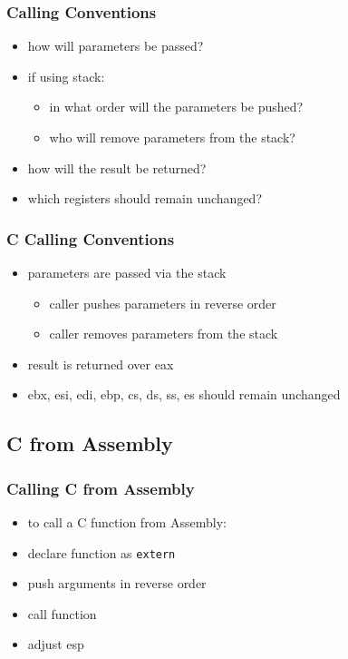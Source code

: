 \documentclass[dvipsnames]{beamer}
\begin{document}
\begin{frame}
  \frametitle{Calling Conventions}

  \begin{itemize}
    \item how will parameters be passed?
      \item if using stack:
      \begin{itemize}
        \item in what order will the parameters be pushed?
        \item who will remove parameters from the stack?
      \end{itemize}

    \item how will the result be returned?

    \item which registers should remain unchanged?
  \end{itemize}
\end{frame}

\begin{frame}
  \frametitle{C Calling Conventions}

  \begin{itemize}
    \item parameters are passed via the stack
    \begin{itemize}
      \item caller pushes parameters in reverse order
      \item caller removes parameters from the stack
    \end{itemize}

    \item result is returned over eax

    \item ebx, esi, edi, ebp, cs, ds, ss, es should remain unchanged
  \end{itemize}
\end{frame}

\subsection{C from Assembly}

\begin{frame}
  \frametitle{Calling C from Assembly}

  \begin{itemize}
    \item to call a C function from Assembly:

    \medskip
    \item declare function as \lstinline|extern|
    \item push arguments in reverse order
    \item call function
    \item adjust esp
  \end{itemize}
\end{frame}
\end{document}
